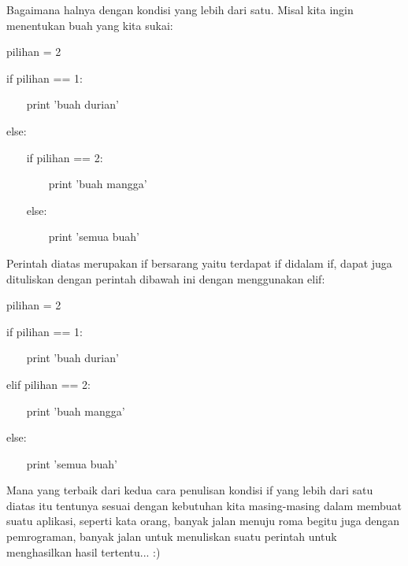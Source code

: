 \vspace{12pt}
\noindent 
Bagaimana halnya dengan kondisi yang lebih dari satu. Misal kita ingin menentukan buah yang kita sukai: \par
\vspace{12pt}
\noindent 
pilihan = 2 \par
\vspace{12pt}
\noindent 
if pilihan == 1: \par
\vspace{12pt}
\noindent 
~~~ print 'buah durian' \par
\vspace{12pt}
\noindent 
else: \par
\vspace{12pt}
\noindent 
~~~ if pilihan == 2: \par
\vspace{12pt}
\noindent 
~~~~~~~ print 'buah mangga' \par
\vspace{12pt}
\noindent 
~~~ else: \par
\vspace{12pt}
\noindent 
~~~~~~~ print 'semua buah' \par
\vspace{12pt}
\noindent 
Perintah diatas merupakan if bersarang yaitu terdapat if didalam if, dapat juga dituliskan dengan perintah dibawah ini dengan menggunakan $  $elif: \par
\vspace{12pt}
\noindent 
pilihan = 2 \par
\vspace{12pt}
\noindent 
if pilihan == 1: \par
\vspace{12pt}
\noindent 
~~~ print 'buah durian' \par
\vspace{12pt}
\noindent 
elif pilihan == 2: \par
\vspace{12pt}
\noindent 
~~~ print 'buah mangga' \par
\vspace{12pt}
\noindent 
else: \par
\vspace{12pt}
\noindent 
~~~ print 'semua buah' \par
\vspace{12pt}
\noindent 
Mana yang terbaik dari kedua cara penulisan kondisi if yang lebih dari satu diatas itu tentunya sesuai dengan kebutuhan kita masing-masing dalam membuat suatu aplikasi, seperti kata orang, banyak jalan menuju roma begitu juga dengan pemrograman, banyak jalan untuk menuliskan suatu perintah untuk menghasilkan hasil tertentu... :) \par
